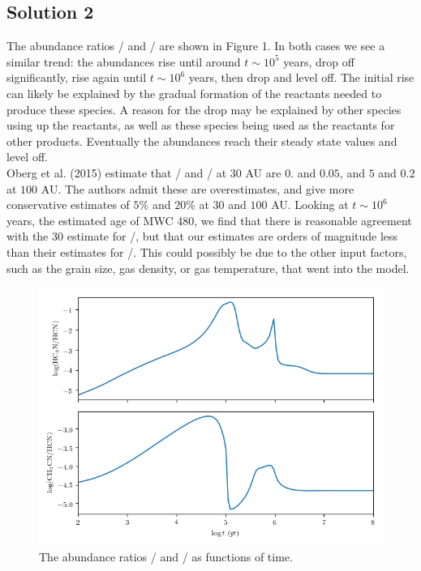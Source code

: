 \documentclass[11pt]{article}
\newenvironment{tight_enumerate}{
    \begin{enumerate}[label=(\alph*)]
    \setlength{\itemsep}{3pt}
    \setlength{\parskip}{0pt}}
    {\end{enumerate}}
\begin{document}
\subsection*{Solution 2}
\begin{tight_enumerate}
\item The abundance ratios / and / are shown in Figure 1. In both cases we see a similar trend: the abundances rise until around $t {\sim} 10^5$ years, drop off significantly, rise again until $t {\sim} 10^6$ years, then drop and level off. The initial rise can likely be explained by the gradual formation of the reactants needed to produce these species. A reason for the drop may be explained by other species using up the reactants, as well as these species being used as the reactants for other products. Eventually the abundances reach their steady state values and level off.\\
\indent Oberg et al. (2015) estimate that / and / at $30$ \si{AU} are $0.$ and $0.05$, and $5$ and $0.2$ at $100$ \si{AU}. The authors admit these are overestimates, and give more conservative estimates of $5\%$ and $20\%$ at $30$ and $100$ \si{AU}. Looking at $t {\sim} 10^6$ years, the estimated age of MWC 480, we find that there is reasonable agreement with the $30$ estimate for /, but that our estimates are orders of magnitude less than their estimates for /. This could possibly be due to the other input factors, such as the grain size, gas density, or gas temperature, that went into the model. 
\begin{figure}[H]
\centering
\includegraphics[height=0.45\textheight]{a/ratios.png}
\caption{The abundance ratios / and / as functions of time.}
\end{figure}


\end{tight_enumerate}
\end{document}
